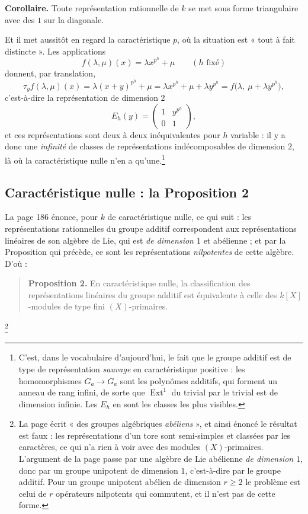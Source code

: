 \documentclass[11pt,a4paper]{article}
\begin{document}
\textbf{Corollaire.} Toute représentation rationnelle de $k$ se met sous forme
triangulaire avec des $1$ sur la diagonale.

Et il met aussitôt en regard la caractéristique $p$, où la situation est « tout
à fait distincte ». Les applications
\[
f(\lambda,\mu)(x) = \lambda x^{p^{h}} + \mu
\qquad (h \text{ fixé})
\]
donnent, par translation,
\[
\tau_{y}f(\lambda,\mu)(x)
= \lambda(x+y)^{p^{h}} + \mu
= \lambda x^{p^{h}} + \mu + \lambda y^{p^{h}}
= f\bigl(\lambda,\ \mu + \lambda y^{p^{h}}\bigr) ,
\]
c'est-à-dire la représentation de dimension $2$
\[
E_{h}(y) = \begin{pmatrix} 1 & y^{p^{h}} \\ 0 & 1 \end{pmatrix} ,
\]
et ces représentations sont deux à deux inéquivalentes pour $h$ variable : il y
a donc une \emph{infinité} de classes de représentations indécomposables de
dimension $2$, là où la caractéristique nulle n'en a qu'une.\footnote{C'est,
dans le vocabulaire d'aujourd'hui, le fait que le groupe additif est de type de
représentation \emph{sauvage} en caractéristique positive : les homomorphismes
$G_{a} \to G_{a}$ sont les polynômes additifs, qui forment un anneau de rang
infini, de sorte que $\operatorname{Ext}^{1}$ du trivial par le trivial est de
dimension infinie. Les $E_{h}$ en sont les classes les plus visibles.}

\subsection*{Caractéristique nulle : la Proposition 2}

La page 186 énonce, pour $k$ de caractéristique nulle, ce qui suit : les
représentations rationnelles du groupe additif correspondent aux
représentations linéaires de son algèbre de Lie, qui est \emph{de dimension
$1$} et abélienne ; et par la Proposition qui précède, ce sont les
représentations \emph{nilpotentes} de cette algèbre. D'où :
\begin{quote}
\textbf{Proposition 2.} En caractéristique nulle, la classification des
représentations linéaires du groupe additif est équivalente à celle des
$k[X]$-modules de type fini $(X)$-primaires.
\end{quote}
\footnote{La page écrit « des groupes algébriques \emph{abéliens} », et ainsi
énoncé le résultat est faux : les représentations d'un tore sont semi-simples
et classées par les caractères, ce qui n'a rien à voir avec des modules
$(X)$-primaires. L'argument de la page passe par une algèbre de Lie abélienne
\emph{de dimension $1$}, donc par un groupe unipotent de dimension $1$,
c'est-à-dire par le groupe additif. Pour un groupe unipotent abélien de
dimension $r \geqslant 2$ le problème est celui de $r$ opérateurs nilpotents
qui commutent, et il n'est pas de cette forme.}
\end{document}
